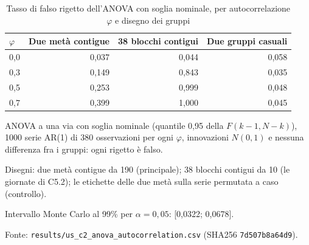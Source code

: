 \begin{table}[htbp]
\centering
\small
\caption{Tasso di falso rigetto dell'ANOVA con soglia nominale, per autocorrelazione $\varphi$ e disegno dei gruppi}
\label{tab:c2_falso_rigetto}
\begin{tabular}{lrrr}
\toprule
$\varphi$ & Due metà contigue & 38 blocchi contigui & Due gruppi casuali \\
\midrule
0,0 & 0,037 & 0,044 & 0,058 \\
0,3 & 0,149 & 0,843 & 0,035 \\
0,5 & 0,253 & 0,999 & 0,048 \\
0,7 & 0,399 & 1,000 & 0,045 \\
\bottomrule
\end{tabular}

\smallskip
\begin{minipage}{\linewidth}
\footnotesize
ANOVA a una via con soglia nominale (quantile 0,95 della $F(k - 1, N - k)$), 1000 serie AR(1) di 380 osservazioni per ogni $\varphi$, innovazioni $N(0, 1)$ e nessuna differenza fra i gruppi: ogni rigetto è falso.\par
Disegni: due metà contigue da 190 (principale); 38 blocchi contigui da 10 (le giornate di C5.2); le etichette delle due metà sulla serie permutata a caso (controllo).\par
Intervallo Monte Carlo al 99\% per $\alpha = 0{,}05$: [0,0322; 0,0678].\par
Fonte: \texttt{results/us\_c2\_anova\_autocorrelation.csv} (SHA256 \texttt{7d507b8a64d9}).
\end{minipage}
\end{table}
